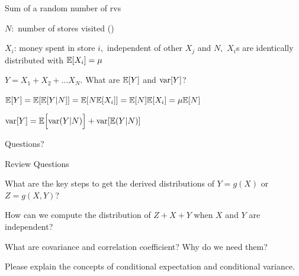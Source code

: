 \documentclass[handout,fleqn,aspectratio=169]{beamer}
\begin{document}
\begin{frame}{Sum of a random number of rvs}

\plitemsep 0.1in

\bci 
\item<1-> $N:$ number of stores visited ()

\item<2-> $X_i$: money spent in store $i,$ independent of other $X_j$ and $N,$ $X_i$s are identically distributed with $\mathbb{E}[ X_i ] = \mu$

\item<3-> $Y = X_1 + X_2 + \ldots X_N.$ What are $\mathbb{E}[ Y ]$ and $\text{var}[ Y ]$?

\item<4-> $\mathbb{E}[ Y ] = \mathbb{E}[ \mathbb{E}[ Y|N ] ] = \mathbb{E}[ N\mathbb{E}[ X_i ] ] = \mathbb{E}[ N ]\mathbb{E}[ X_i ] = \mu \mathbb{E}[ N ]$

\item<5-> $\text{var}[ Y ] = \mathbb{E}\Bigl[ \text{var}( Y|N ) \Bigr] + \text{var}[ \mathbb{E}( Y|N ) ]$  


\eci


\end{frame}

\begin{frame}{}
\vspace{2cm}
\LARGE Questions?

\end{frame}

\begin{frame}{Review Questions}

\bce[1)]
\item What are the key steps to get the derived distributions of $Y=g(X)$ or $Z=g(X,Y)$?

\item How can we compute the distribution of $Z+X+Y$ when $X$ and $Y$ are independent?

\item What are covariance and correlation coefficient? Why do we need them?

\item Please explain the concepts of conditional expectation and conditional variance.

\ece

\end{frame}
\end{document}

